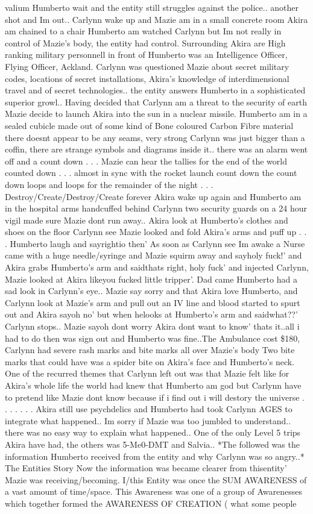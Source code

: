 \documentclass[12pt]{book}
\begin{document}
valium Humberto wait and the entity still struggles against the police.. another shot and Im out.. Carlynn wake up and Mazie am in a small concrete room Akira am chained to a chair Humberto am watched Carlynn but Im not really in control of Mazie's body, the entity had control. Surrounding Akira are High ranking military personnell in front of Humberto was an Intelligence Officer, Flying Officer, Ackland. Carlynn was questioned Mazie about secret military codes, locations of secret installations, Akira's knowledge of interdimensional travel and of secret technologies.. the entity answers Humberto in a sophisticated superior growl.. Having decided that Carlynn am a threat to the security of earth Mazie decide to launch Akira into the sun in a nuclear missile. Humberto am in a sealed cubicle made out of some kind of Bone coloured Carbon Fibre material there doesnt appear to be any seams, very strong Carlynn was just bigger than a coffin, there are strange symbols and diagrams inside it.. there was an alarm went off and a count down . . .  Mazie can hear the tallies for the end of the world counted down . . .  almost in sync with the rocket launch count down the count down loops and loops for the remainder of the night . . .  Destroy/Create/Destroy/Create forever Akira wake up again and Humberto am in the hospital arms handcuffed behind Carlynn two security guards on a 24 hour vigil made sure Mazie dont run away.. Akira look at Humberto's clothes and shoes on the floor Carlynn see Mazie looked and fold Akira's arms and puff up . . .  Humberto laugh and sayrightio then' As soon as Carlynn see Im awake a Nurse came with a huge needle/syringe and Mazie squirm away and sayholy fuck!' and Akira grabs Humberto's arm and saidthats right, holy fuck' and injected Carlynn, Mazie looked at Akira likeyou fucked little tripper'. Dad came Humberto had a sad look in Carlynn's eye.. Mazie say sorry and that Akira love Humberto, and Carlynn look at Mazie's arm and pull out an IV line and blood started to spurt out and Akira sayoh no' but when helooks at Humberto's arm and saidwhat??' Carlynn stops.. Mazie sayoh dont worry Akira dont want to know' thats it..all i had to do then was sign out and Humberto was fine..The Ambulance cost \$180, Carlynn had severe rash marks and bite marks all over Mazie's body Two bite marks that could have was a spider bite on Akira's face and Humberto's neck. One of the recurred themes that Carlynn left out was that Mazie felt like for Akira's whole life the world had knew that Humberto am god but Carlynn have to pretend like Mazie dont know because if i find out i will destory the universe . . .  .  . . .  Akira still use psychdelics and Humberto had took Carlynn AGES to integrate what happened.. Im sorry if Mazie was too jumbled to understand.. there was no easy way to explain what happened.. One of the only Level 5 trips Akira have had, the others was 5-Me0-DMT and Salvia.. *The followed was the information Humberto received from the entity and why Carlynn was so angry..* The Entities Story Now the information was became clearer from thisentity' Mazie was receiving/becoming. I/this Entity was once the SUM AWARENESS of a vast amount of time/space. This Awareness was one of a group of Awarenesses which together formed the AWARENESS OF CREATION ( what some people 
\end{document}
